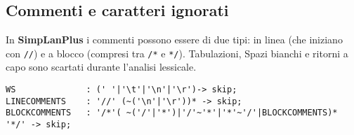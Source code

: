 \documentclass[../../main]{subfiles}
\begin{document}
\subsection{Commenti e caratteri ignorati}
In \textbf{SimpLanPlus} i commenti possono essere di due tipi: 
in linea (che iniziano con \verb|//|) e a blocco (compresi tra \verb|/*| e \verb|*/|). Tabulazioni, Spazi bianchi 
e ritorni a capo sono scartati durante l'analisi lessicale.
\begin{lstlisting}[style=antlr]
WS              : (' '|'\t'|'\n'|'\r')-> skip;
LINECOMMENTS 	: '//' (~('\n'|'\r'))* -> skip;
BLOCKCOMMENTS   : '/*'( ~('/'|'*')|'/'~'*'|'*'~'/'|BLOCKCOMMENTS)* '*/' -> skip;
\end{lstlisting}
\end{document}
